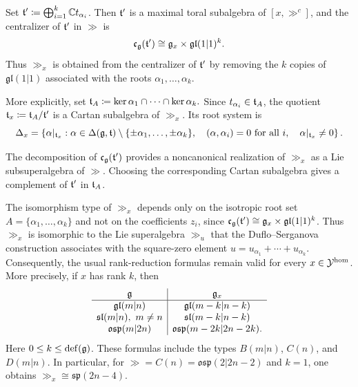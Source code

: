 Set $\tt'\coloneqq \bigoplus_{i=1}^{k}\CC t_{\alpha_{i}}$. Then $\tt'$ is a maximal toral subalgebra of $[x,\gg^{c}]$, and the centralizer of $\tt'$ in $\gg$ is~\cite[Theorem~3.12]{Sherman2025}
\begin{equation}
\mathfrak{c}_{\gg}(\tt')
\cong
\gg_{x}\times\mathfrak{gl}(1\vert1)^{k}.
\end{equation}
Thus $\gg_{x}$ is obtained from the centralizer of $\tt'$ by removing the $k$ copies of $\mathfrak{gl}(1\vert1)$ associated with the roots $\alpha_{1},\ldots,\alpha_{k}$.

More explicitly, set
$
\tt_{A}
\coloneqq 
\ker\alpha_{1}\cap\cdots\cap\ker\alpha_{k}.
$
Since $t_{\alpha_{i}}\in\tt_{A}$, the quotient
$
\tt_{x}
\coloneqq 
\tt_{A}/\tt'
$
is a Cartan subalgebra of $\gg_{x}$.
Its root system is
\begin{equation}\label{eq::generalized_gx_roots}
\Delta_{x}
=
\left\{
\alpha|_{\tt_{x}}
:
\alpha\in\Delta(\gg,\tt)\setminus
\{\pm\alpha_{1},\ldots,\pm\alpha_{k}\},
\quad
(\alpha,\alpha_{i})=0
\text{ for all }i,
\quad
\alpha|_{\tt_{x}}\neq0
\right\}.
\end{equation}

The decomposition of $\mathfrak{c}_{\gg}(\tt')$ provides a noncanonical realization of $\gg_x$ as a Lie subsuperalgebra of $\gg$. Choosing the corresponding Cartan subalgebra gives a complement of $\tt'$ in $\tt_{A}$.

The isomorphism type of $\gg_{x}$ depends only on the isotropic root set
$A=\{\alpha_{1},\ldots,\alpha_{k}\}$ and not on the coefficients $z_{i}$, since
$\mathfrak{c}_{\gg}(\tt')\cong\gg_{x}\times\mathfrak{gl}(1\vert1)^{k}$.
Thus $\gg_{x}$ is isomorphic to the Lie superalgebra $\gg_{u}$ that the Duflo--Serganova construction associates with the
square-zero element $u=u_{\alpha_{1}}+\cdots+u_{\alpha_{k}}$. Consequently, the usual
rank-reduction formulas remain valid for every $x\in\YY^{\hom}$. More precisely, if $x$ has rank $k$, then
\begin{equation}
\begin{array}{c|c}
\gg & \gg_{x}\\
\hline
\mathfrak{gl}(m\vert n)
&
\mathfrak{gl}(m-k\vert n-k)
\\
\sl(m\vert n),\ m\neq n
&
\sl(m-k\vert n-k)
\\
\mathfrak{osp}(m\vert2n)
&
\mathfrak{osp}(m-2k\vert2n-2k).
\end{array}
\end{equation}
Here $0\leq k\leq\defect(\gg)$. These formulas include the types
$B(m\vert n)$, $C(n)$, and $D(m\vert n)$. In particular, for
$\gg=C(n)=\mathfrak{osp}(2\vert2n-2)$ and $k=1$, one obtains
$\gg_{x}\cong\mathfrak{sp}(2n-4)$.


